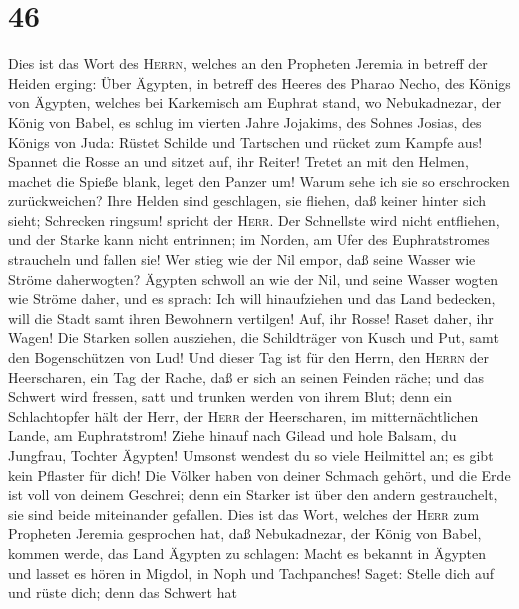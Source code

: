 \hypertarget{section-45}{%
\section{46}\label{section-45}}

 Dies ist das Wort des \textsc{Herrn}, welches an den
Propheten Jeremia in betreff der Heiden erging:  Über
Ägypten, in betreff des Heeres des Pharao Necho, des Königs von Ägypten,
welches bei Karkemisch am Euphrat stand, wo Nebukadnezar, der König von
Babel, es schlug im vierten Jahre Jojakims, des Sohnes Josias, des
Königs von Juda:  Rüstet Schilde und Tartschen und rücket
zum Kampfe aus!  Spannet die Rosse an und sitzet auf, ihr
Reiter! Tretet an mit den Helmen, machet die Spieße blank, leget den
Panzer um!  Warum sehe ich sie so erschrocken
zurückweichen? Ihre Helden sind geschlagen, sie fliehen, daß keiner
hinter sich sieht; Schrecken ringsum! spricht der \textsc{Herr}.
 Der Schnellste wird nicht entfliehen, und der Starke kann
nicht entrinnen; im Norden, am Ufer des Euphratstromes straucheln und
fallen sie!  Wer stieg wie der Nil empor, daß seine Wasser
wie Ströme daherwogten?  Ägypten schwoll an wie der Nil,
und seine Wasser wogten wie Ströme daher, und es sprach: Ich will
hinaufziehen und das Land bedecken, will die Stadt samt ihren Bewohnern
vertilgen!  Auf, ihr Rosse! Raset daher, ihr Wagen! Die
Starken sollen ausziehen, die Schildträger von Kusch und Put, samt den
Bogenschützen von Lud!  Und dieser Tag ist für den Herrn,
den \textsc{Herrn} der Heerscharen, ein Tag der Rache, daß er sich an
seinen Feinden räche; und das Schwert wird fressen, satt und trunken
werden von ihrem Blut; denn ein Schlachtopfer hält der Herr, der
\textsc{Herr} der Heerscharen, im mitternächtlichen Lande, am
Euphratstrom!  Ziehe hinauf nach Gilead und hole Balsam,
du Jungfrau, Tochter Ägypten! Umsonst wendest du so viele Heilmittel an;
es gibt kein Pflaster für dich!  Die Völker haben von
deiner Schmach gehört, und die Erde ist voll von deinem Geschrei; denn
ein Starker ist über den andern gestrauchelt, sie sind beide miteinander
gefallen.  Dies ist das Wort, welches der \textsc{Herr}
zum Propheten Jeremia gesprochen hat, daß Nebukadnezar, der König von
Babel, kommen werde, das Land Ägypten zu schlagen:  Macht
es bekannt in Ägypten und lasset es hören in Migdol, in Noph und
Tachpanches! Saget: Stelle dich auf und rüste dich; denn das Schwert hat
